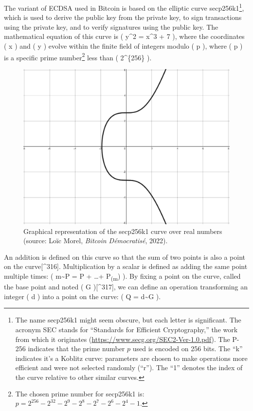 \documentclass[
  a5paper,
  smalldemyvopaper,10pt,twoside,onecolumn,openright,extrafontsizes,hidelinks]{memoir}
\begin{document}
The variant of ECDSA used in Bitcoin is based on the elliptic curve
secp256k1\footnote{The name secp256k1 might seem obscure, but each
  letter is significant. The acronym SEC stands for ``Standards for
  Efficient Cryptography,'' the work from which it originates
  (\url{https://www.secg.org/SEC2-Ver-1.0.pdf}). The P-256 indicates
  that the prime number \(p\) used is encoded on 256 bits. The ``k''
  indicates it's a Koblitz curve: parameters are chosen to make
  operations more efficient and were not selected randomly (``r''). The
  ``1'' denotes the index of the curve relative to other similar curves.},
which is used to derive the public key from the private key, to sign
transactions using the private key, and to verify signatures using the
public key. The mathematical equation of this curve is ( y\^{}2 = x\^{}3
+ 7 ), where the coordinates ( x ) and ( y ) evolve within the finite
field of integers modulo ( p ), where ( p ) is a specific prime
number\footnote{The chosen prime number for secp256k1 is:
  \(p = 2^{256} - 2^{32} - 2^9 - 2^8 - 2^7 - 2^6 - 2^4 - 1\).} less than
( 2\^{}\{256\} ).

\begin{figure}

{\centering \includegraphics{chapters/img/secp256k1-curve.png}

}

\caption{Graphical representation of the secp256k1 curve over real
numbers (source: Loïc Morel, \emph{Bitcoin Démocratisé}, 2022).}

\end{figure}%

An addition is defined on this curve so that the sum of two points is
also a point on the curve{[}\^{}316{]}. Multiplication by a scalar is
defined as adding the same point multiple times: ( m\textasciitilde P =
P + \ldots + P\textsubscript{(m}) ). By fixing a point on
the curve, called the base point and noted ( G ){[}\^{}317{]}, we can
define an operation transforming an integer ( d ) into a point on the
curve: ( Q = d\textasciitilde G ).
\end{document}
